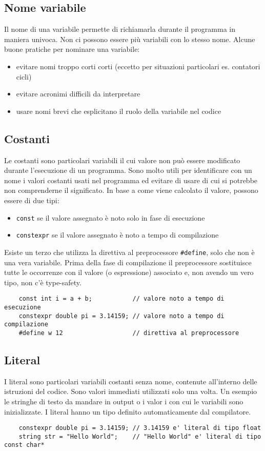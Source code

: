 \documentclass[a4paper]{article}
\begin{document}
\newpage

\subsection{Nome variabile}
Il nome di una variabile permette di richiamarla durante il programma in maniera univoca. Non ci possono essere più variabili con
lo stesso nome. Alcune buone pratiche per nominare una variabile:
\begin{itemize}
	\item evitare nomi troppo corti corti (eccetto per situazioni particolari es. contatori cicli)
	\item evitare acronimi difficili da interpretare
	\item usare nomi brevi che esplicitano il ruolo della variabile nel codice
\end{itemize}

\subsection{Costanti}
Le costanti sono particolari variabili il cui valore non può essere modificato durante l'esecuzione di un programma. Sono molto
utili per identificare con un nome i valori costanti usati nel programma ed evitare di usare  di cui si
potrebbe non comprenderne il significato. In base a come viene calcolato il valore, possono essere di due tipi:
\begin{itemize}
	\item \verb|const| se il valore assegnato è noto solo in fase di esecuzione
	\item \verb|constexpr| se il valore assegnato è noto a tempo di compilazione
\end{itemize}
Esiste un terzo  che utilizza la direttiva al preprocessore \verb|#define|, solo che non è una vera variabile. Prima
della fase di compilazione il preprocessore sostituisce tutte le occorrenze con il valore (o espressione) associato e, non avendo
un vero tipo, non c'è type-safety.
\begin{lstlisting}
	const int i = a + b;           // valore noto a tempo di esecuzione
	constexpr double pi = 3.14159; // valore noto a tempo di compilazione
	#define w 12                   // direttiva al preprocessore
\end{lstlisting}

\subsection{Literal}
I literal sono particolari variabili costanti senza nome, contenute all'interno delle istruzioni del codice. Sono valori
immediati utilizzati solo una volta. Un esempio le stringhe di testo da mandare in output o i valor i con cui le variabili
sono inizializzate. I literal hanno un tipo definito automaticamente dal compilatore.
\begin{lstlisting}
	constexpr double pi = 3.14159; // 3.14159 e' literal di tipo float
	string str = "Hello World";    // "Hello World" e' literal di tipo const char*
\end{lstlisting}
\end{document}
